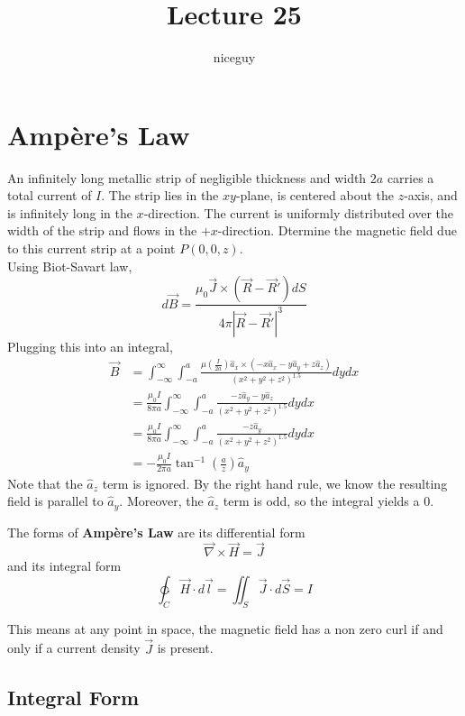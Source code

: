 \documentclass[12pt]{article}
\author{niceguy}
\title{Lecture 25}
\begin{document}
\maketitle

\section{Amp\`ere's Law}
\begin{ex}
	An infinitely long metallic strip of negligible thickness and width $2a$ carries a total current of $I$. The strip lies in the $xy$-plane, is centered about the $z$-axis, and is infinitely long in the $x$-direction. The current is uniformly distributed over the width of the strip and flows in the $+x$-direction. Dtermine the magnetic field due to this current strip at a point $P(0,0,z)$. \\
	Using Biot-Savart law,
	$$d\vec{B} = \frac{\mu_0\vec{J}\times(\vec{R}-\vec{R}')dS}{4\pi|\vec{R}-\vec{R}'|^3}$$
	Plugging this into an integral,
	\begin{align*}
		\vec{B} &= \int_{-\infty}^\infty \int_{-a}^a \frac{\mu(\frac{I}{2a})\hat{a}_x\times(-x\hat{a}_x-y\hat{a}_y+z\hat{a}_z)}{(x^2+y^2+z^2)^{1.5}} dydx \\
			     &= \frac{\mu_0I}{8\pi a}\int_{-\infty}^\infty \int_{-a}^a \frac{-z\hat{a}_y-y\hat{a}_z}{(x^2+y^2+z^2)^{1.5}} dydx \\
			     &= \frac{\mu_0I}{8\pi a}\int_{-\infty}^\infty \int_{-a}^a \frac{-z\hat{a}_y}{(x^2+y^2+z^2)^{1.5}} dydx \\
			     &= -\frac{\mu_0I}{2\pi a}\tan^{-1}\left(\frac{a}{z}\right)\hat{a}_y
	\end{align*}
	Note that the $\hat{a}_z$ term is ignored. By the right hand rule, we know the resulting field is parallel to $\hat{a}_y$. Moreover, the $\hat{a}_z$ term is odd, so the integral yields a 0.
\end{ex}

The forms of \textbf{Amp\`ere's Law} are its differential form
$$\vec{\nabla}\times\vec{H} = \vec{J}$$
and its integral form
$$\ointctrclockwise_C \vec{H} \cdot d\vec{l} = \iint_S \vec{J} \cdot d\vec{S} = I$$

This means at any point in space, the magnetic field has a non zero curl if and only if a current density $\vec{J}$ is present.

\subsection{Integral Form}
\end{document}
